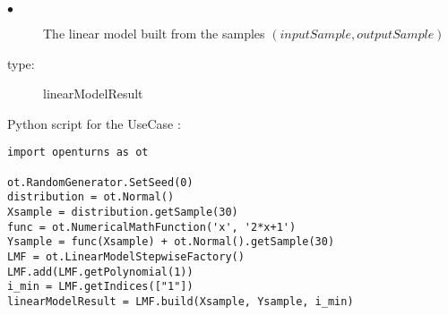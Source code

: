 {
  \begin{description}
  \item[$\bullet$] The linear model built from the samples $(inputSample,outputSample)$
  \item[type:] linearModelResult
  \end{description}
}

Python script for the UseCase :

\begin{lstlisting}
import openturns as ot

ot.RandomGenerator.SetSeed(0)
distribution = ot.Normal()
Xsample = distribution.getSample(30)
func = ot.NumericalMathFunction('x', '2*x+1')
Ysample = func(Xsample) + ot.Normal().getSample(30)
LMF = ot.LinearModelStepwiseFactory()
LMF.add(LMF.getPolynomial(1))
i_min = LMF.getIndices(["1"])
linearModelResult = LMF.build(Xsample, Ysample, i_min)

\end{lstlisting}



